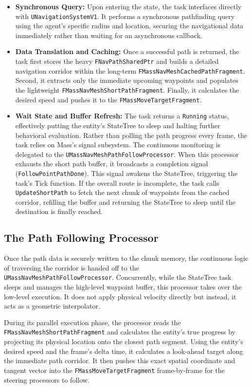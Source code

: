 \begin{itemize}
    \item \textbf{Synchronous Query:} Upon entering the state, the task interfaces directly with \texttt{UNavigationSystemV1}. It performs a synchronous pathfinding query using the agent's specific radius and location, securing the navigational data immediately rather than waiting for an asynchronous callback.
    \item \textbf{Data Translation and Caching:} Once a successful path is returned, the task first stores the heavy \texttt{FNavPathSharedPtr} and builds a detailed navigation corridor within the long-term \texttt{FMassNavMeshCachedPathFragment}. Second, it extracts only the immediate upcoming waypoints and populates the lightweight \texttt{FMassNavMeshShortPathFragment}. Finally, it calculates the desired speed and pushes it to the \texttt{FMassMoveTargetFragment}.
    \item \textbf{Wait State and Buffer Refresh:} The task returns a \texttt{Running} status, effectively putting the entity's StateTree to sleep and halting further behavioral evaluation. Rather than polling the path progress every frame, the task relies on Mass's signal subsystem. The continuous monitoring is delegated to the \texttt{UMassNavMeshPathFollowProcessor}. When this processor exhausts the short path buffer, it broadcasts a completion signal (\texttt{FollowPointPathDone}). This signal awakens the StateTree, triggering the task's Tick function. If the overall route is incomplete, the task calls \texttt{UpdateShortPath} to fetch the next chunk of waypoints from the cached corridor, refilling the buffer and returning the StateTree to sleep until the destination is finally reached.
\end{itemize}

\subsection{The Path Following Processor}
Once the path data is securely written to the chunk memory, the continuous logic of traversing the corridor is handed off to the \texttt{UMassNavMeshPathFollowProcessor}. Concurrently, while the StateTree task sleeps and manages the high-level waypoint buffer, this processor takes over the low-level execution. It does not apply physical velocity directly but instead, it acts as a geometric interpolator.

During its parallel execution phase, the processor reads the \newline\texttt{FMassNavMeshShortPathFragment} and calculates the entity's true progress by projecting its physical location onto the closest path segment. Using the entity's desired speed and the frame's delta time, it calculates a look-ahead target along the immediate path corridor. It then pushes this exact spatial coordinate and tangent vector into the \texttt{FMassMoveTargetFragment} frame-by-frame for the steering processors to follow.

